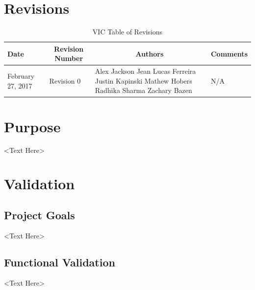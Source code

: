 \documentclass [10pt]{article}
\begin{document}
\section{Revisions}
\begin{longtable}{| p{ } | p{ } | p{ } | p{ } |} \caption{VIC Table of Revisions}  \\

\hline 
\centering \textbf{Date} & 
\multicolumn{1}{c}{\textbf {Revision Number}} &
\multicolumn{1}{|c}{\textbf {Authors}} & 
\multicolumn{1}{|c|}{\textbf {Comments}} \\ \hline

\multirow{4}{*}{\centering February 27, 2017}  & 
\multirow{4}{*}{Revision 0}& 
{Alex Jackson \newline
Jean Lucas Ferreira \newline
Justin Kapinski\newline
Mathew Hobers\newline
Radhika Sharma\newline
Zachary Bazen}
&
 \multirow{4}{*}{N/A} \\ 
\hline 


\end{longtable}
\pagebreak





%

\section {Purpose}
<Text Here>



\section {Validation}
\subsection{Project Goals}

<Text Here>


\subsection{Functional Validation}
<Text Here>
\end{document}

